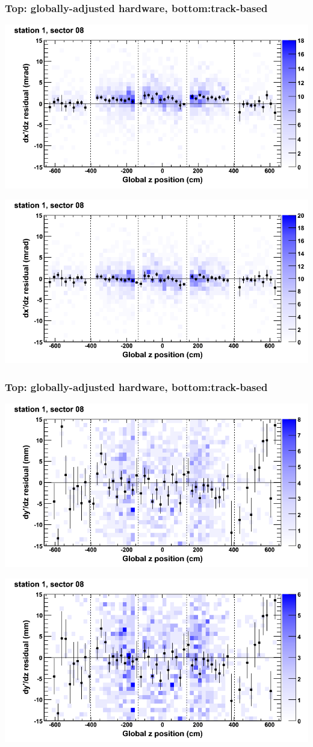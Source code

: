 \documentclass[compress]{beamer}
\begin{document}
\begin{frame}
\frametitle{Top: globally-adjusted hardware, bottom:track-based}
\includegraphics[width=0.7\linewidth]{NOV4_mapplots_HW/DTvsz_st1sec08_dxdz.png}

\includegraphics[width=0.7\linewidth]{NOV4_mapplots/DTvsz_st1sec08_dxdz.png}
\end{frame}

\begin{frame}
\frametitle{Top: globally-adjusted hardware, bottom:track-based}
\includegraphics[width=0.7\linewidth]{NOV4_mapplots_HW/DTvsz_st1sec08_dydz.png}

\includegraphics[width=0.7\linewidth]{NOV4_mapplots/DTvsz_st1sec08_dydz.png}
\end{frame}
\end{document}
